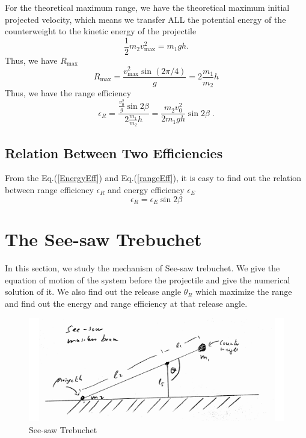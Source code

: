 \documentclass[%
reprint,
amsmath,amssymb,
aps,
]{revtex4-1}
\begin{document}
	For the theoretical maximum range, we have the theoretical maximum initial projected velocity, which means we transfer ALL the potential energy of the counterweight to the kinetic energy of the projectile
	\begin{equation}
	\frac{1}{2}m_2v_{\mathrm{max}}^2=m_1gh.
	\end{equation}
	Thus, we have $R_{\mathrm{max}}$
	\begin{equation}
	R_{\mathrm{max}}=\frac{v_{\mathrm{max}}^2\sin(2\pi/4)}{g}=2\frac{m_1}{m_2}h
	\end{equation}
	Thus, we have the range efficiency
	\begin{equation}
	\epsilon_R=\frac{\frac{v_0^2}{g}\sin{2\beta}}{2\frac{m_1}{m_2}h} = \frac{m_2 v_0^2}{2m_1gh}\sin 2\beta\;.
	\label{rangeEff}
	\end{equation}
	\subsection{Relation Between Two Efficiencies}
	From the Eq.(\ref{EnergyEff}) and Eq.(\ref{rangeEff}), it is easy to find out the relation between range efficiency $\epsilon_R$ and energy efficiency $\epsilon_E$
	\begin{equation}
	\epsilon_R=\epsilon_E\sin{2\beta}
	\end{equation}
	\newline\newline
	\section{The See-saw Trebuchet}
	In this section, we study the mechanism of See-saw trebuchet. We give the equation of motion of the system before the projectile and give the numerical solution of it. We also find out the release angle $\theta_R$ which maximize the range and find out the energy and range efficiency at that release angle.
	\begin{figure}
		\centering
		\includegraphics[scale=0.6]{Seesawmodel.png}
		\caption{See-saw Trebuchet}
	\end{figure}
\end{document}
